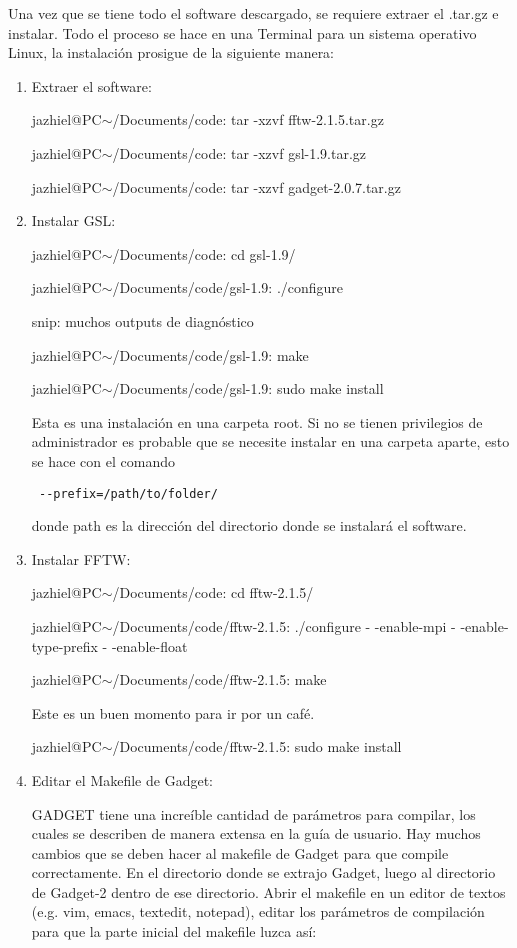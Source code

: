 \documentclass[a4paper,openright,12pt]{book}
\begin{document}
Una vez que se tiene todo el software descargado, se requiere extraer el \textsf{.tar.gz} e instalar. Todo el proceso se hace en una Terminal para un sistema operativo Linux, la instalación prosigue de la siguiente manera:
\begin{enumerate}
\item Extraer el software:

\textsf{jazhiel@PC$\sim$/Documents/code: tar -xzvf fftw-2.1.5.tar.gz}

\textsf{jazhiel@PC$\sim$/Documents/code: tar -xzvf gsl-1.9.tar.gz}

\textsf{jazhiel@PC$\sim$/Documents/code: tar -xzvf gadget-2.0.7.tar.gz}

\item Instalar GSL:

\textsf{jazhiel@PC$\sim$/Documents/code: cd gsl-1.9/}

\textsf{jazhiel@PC$\sim$/Documents/code/gsl-1.9: ./configure}

\textsf{snip: muchos outputs de diagnóstico}

\textsf{jazhiel@PC$\sim$/Documents/code/gsl-1.9: make}

\textsf{jazhiel@PC$\sim$/Documents/code/gsl-1.9: sudo make install}

Esta es una instalación en una carpeta \textsf{root}. Si no se tienen privilegios de administrador es probable que se necesite instalar en una carpeta aparte, esto se hace con el comando \begin{verbatim} --prefix=/path/to/folder/
\end{verbatim}  donde \textsf{path} es la dirección del directorio donde se instalará el software.

\item Instalar FFTW:

\textsf{jazhiel@PC$\sim$/Documents/code: cd fftw-2.1.5/}

\textsf{jazhiel@PC$\sim$/Documents/code/fftw-2.1.5: ./configure - -enable-mpi - -enable-type-prefix - -enable-float}

\textsf{jazhiel@PC$\sim$/Documents/code/fftw-2.1.5: make}

\textsf{Este es un buen momento para ir por un café.}

\textsf{jazhiel@PC$\sim$/Documents/code/fftw-2.1.5: sudo make install}

\item Editar el \textsf{Makefile} de Gadget:

GADGET tiene una increíble cantidad de parámetros para compilar, los cuales se describen de manera extensa en la guía de usuario. Hay muchos cambios que se deben hacer al \textsf{makefile} de Gadget para que compile correctamente.  En el directorio donde se extrajo Gadget, luego al directorio de \textsf{Gadget-2} dentro de ese directorio. Abrir el \textsf{makefile} en un editor de textos (e.g. \textsf{vim, emacs, textedit, notepad}), editar los parámetros de compilación para que la parte inicial del \textsf{makefile} luzca así:
\begin{verbatim}


\end{verbatim}
\end{enumerate}
\end{document}
